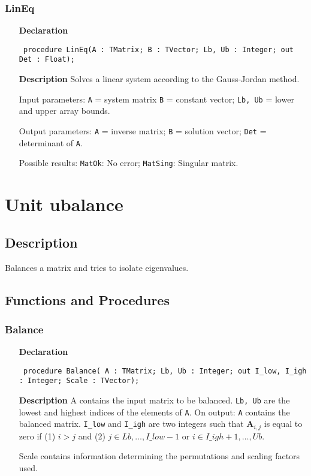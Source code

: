\documentclass[12pt,a4paper,oneside]{report}
\newcommand{\declarationitem}[1]{\textbf{#1}}
\newcommand{\descriptiontitle}[1]{\textbf{#1}}
\newcommand{\code}[1]{\texttt{#1}}
\begin{document}
\subsubsection{LinEq}
\label{ulineq-LinEq}
\begin{itemize}\item[\declarationitem{Declaration}\hfill]
	\begin{flushleft}
		\code{
			procedure LinEq(A : TMatrix; B : TVector; Lb, Ub : Integer; out Det : Float);}
		
	\end{flushleft}
	
	\par
	\item[\descriptiontitle{Description}]
	Solves a linear system according to the Gauss{-}Jordan method.
	
	Input parameters: \code{A} = system matrix \code{B} = constant vector; \code{Lb, Ub} = lower and upper array bounds.
	
	Output parameters: \code{A} = inverse matrix; \code{B} = solution vector; \code{Det} = determinant of \code{A}.
	
	Possible results: \code{MatOk}: No error; \code{MatSing}: Singular matrix.
	
\end{itemize}
\section{Unit ubalance}
\label{ubalance}
\subsection{Description}
Balances a matrix and tries to isolate eigenvalues. 
\subsection{Functions and Procedures}
\subsubsection{Balance}
\label{ubalance-Balance}
\begin{itemize}\item[\declarationitem{Declaration}\hfill]
	\begin{flushleft}
		\code{
			procedure Balance( A : TMatrix; Lb, Ub : Integer; out I{\_}low, I{\_}igh : Integer; Scale : TVector);}
	\end{flushleft}
	\par
	\item[\descriptiontitle{Description}]
	A contains the input matrix to be balanced. \code{Lb, Ub} are the lowest and highest indices of the elements of \code{A}. On output: \code{A} contains the balanced matrix. \code{I{\_}low} and \code{I{\_}igh} are two integers such that $\textbf{A}_{i,j}$ is equal to zero if (1) $i > j$ and (2) $j \in Lb,\dots,I\!\_low{-}1$ or $i \in I\!\_igh+1,\dots,Ub$.
	
	Scale contains information determining the  permutations and scaling factors used.
	
\end{itemize}
\end{document}

